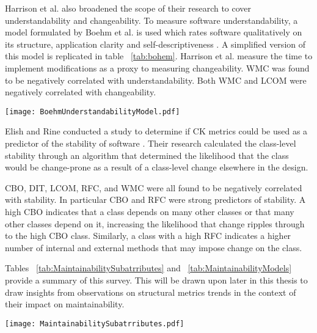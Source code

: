 Harrison et al. also broadened the scope of their research to cover understandability and changeability. To measure software understandability, a model formulated by Boehm et al. is used which rates software qualitatively on its structure, application clarity and self-descriptiveness \citep{boehm1978characteristics}. A simplified version of this model is replicated in table ~\ref{tab:bohem}. Harrison et al. measure the time to implement modifications as a proxy to measuring changeability. WMC was found to be negatively correlated with understandability. Both WMC and LCOM were negatively correlated with changeability.

\begin{table}
\begin{tabular}
 \centering 
 \texttt{[image: BoehmUnderstandabilityModel.pdf]}
 \label{tab:bohem}
\end{tabular}
\end{table}

Elish and Rine conducted a study to determine if CK metrics could be used as a predictor of the stability of software \citep{elish2003investigation}. Their research calculated the class-level stability through an algorithm that determined the likelihood that the class would be change-prone as a result of a class-level change elsewhere in the design. 

CBO, DIT, LCOM, RFC, and WMC were all found to be negatively correlated with stability. In particular CBO and RFC were strong predictors of stability. A high CBO indicates that a class depends on many other classes or that many other classes depend on it, increasing the likelihood that change ripples through to the high CBO class. Similarly, a class with a high RFC indicates a higher number of internal and external methods that may impose change on the class. 

Tables ~\ref{tab:MaintainabilitySubatrributes} and  ~\ref{tab:MaintainabilityModels} provide a summary of this survey. This will be drawn upon later in this thesis to draw insights from observations on structural metrics trends in the context of their impact on maintainability.

\begin{table}
\begin{tabular}
\centering 
\texttt{[image: MaintainabilitySubatrributes.pdf]}
\label{tab:MaintainabilitySubatrributes}
\end{tabular}
\end{table}

